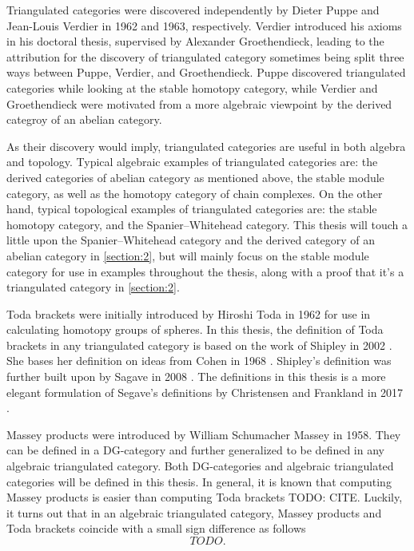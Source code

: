 Triangulated categories were discovered independently by Dieter Puppe and Jean-Louis Verdier in 1962 and 1963, respectively. Verdier introduced his axioms in his doctoral thesis, supervised by Alexander Groethendieck, leading to the attribution for the discovery of triangulated category sometimes being split three ways between Puppe, Verdier, and Groethendieck. Puppe discovered triangulated categories while looking at the stable homotopy category, while Verdier and Groethendieck were motivated from a more algebraic viewpoint by the derived categroy of an abelian category.

As their discovery would imply, triangulated categories are useful in both algebra and topology. Typical algebraic examples of triangulated categories are: the derived categories of abelian category as mentioned above, the stable module category, as well as the homotopy category of chain complexes. On the other hand, typical topological examples of triangulated categories are: the stable homotopy category, and the Spanier--Whitehead category. This thesis will touch a little upon the Spanier--Whitehead category and the derived category of an abelian category in \autoref{section:2}, but will mainly focus on the stable module category for use in examples throughout the thesis, along with a proof that it's a triangulated category in \autoref{section:2}.

Toda brackets were initially introduced by Hiroshi Toda in 1962 for use in calculating homotopy groups of spheres. In this thesis, the definition of Toda brackets in any triangulated category is based on the work of Shipley in 2002 \cite[Definition A.2]{Shipley_2002}. She bases her definition on ideas from Cohen in 1968 \cite[Definition at the bottom of p. 308]{Cohen_1968}. Shipley's definition was further built upon by Sagave in 2008 \cite[Remark 4.5]{Sagave_2008}. The definitions in this thesis is a more elegant formulation of Segave's definitions by Christensen and Frankland in 2017 \cite[Definition 3.1]{Christensen-Frankland_2017}.

Massey products were introduced by William Schumacher Massey in 1958. They can be defined in a DG-category and further generalized to be defined in any algebraic triangulated category. Both DG-categories and algebraic triangulated categories will be defined in this thesis. In general, it is known that computing Massey products is easier than computing Toda brackets TODO: CITE. Luckily, it turns out that in an algebraic triangulated category, Massey products and Toda brackets coincide with a small sign difference as follows
\[
    TODO.
\]

